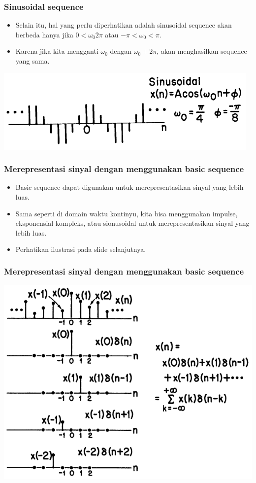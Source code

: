 \documentclass[pdflatex,compress]{beamer}
\begin{document}
\begin{frame}
	\frametitle{Sinusoidal sequence}
		\begin{itemize}
		\item Selain itu, hal yang perlu diperhatikan adalah sinusoidal sequence akan berbeda hanya jika $0 < \omega_0 2\pi $ atau $ -\pi < \omega_0 < \pi $.
		\item Karena jika kita mengganti $ \omega_0 $ dengan $ \omega_0 + 2\pi $, akan menghasilkan sequence yang sama.
	\end{itemize}
	\begin{center}
		\includegraphics[width=0.8\linewidth]{img/img010}
	\end{center}
\end{frame}

\begin{frame}
	\frametitle{Merepresentasi sinyal dengan menggunakan basic sequence}
	\begin{itemize}
		\item Basic sequence dapat digunakan untuk merepresentasikan sinyal yang lebih luas.
		\item Sama seperti di domain waktu kontinyu, kita bisa menggunakan impulse, eksponensial kompleks, atau sionusoidal untuk merepresentasikan sinyal yang lebih luas.
		\item Perhatikan ilustrasi pada slide selanjutnya.
	\end{itemize}
\end{frame}

\begin{frame}
	\frametitle{Merepresentasi sinyal dengan menggunakan basic sequence}
	\begin{center}
		\includegraphics[width=0.8\linewidth]{img/img012}
	\end{center}
\end{frame}
\end{document}

